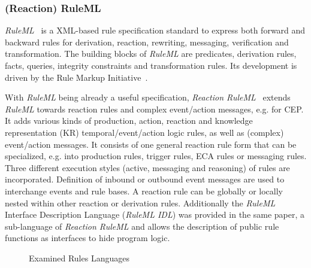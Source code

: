\documentclass[11pt]{article}%
\begin{document}
\subsubsection{(Reaction) RuleML}
\textit{RuleML}~\cite{2006-Boley-RuleML.pdf} is a XML-based rule specification standard to express both forward and backward rules for derivation, reaction, rewriting, messaging, verification and transformation. The building blocks of \textit{RuleML} are predicates, derivation rules, facts, queries, integrity constraints and transformation rules. Its development is driven by the Rule Markup Initiative~\cite{wwwruleml}.

With \textit{RuleML} being already a useful specification, \textit{Reaction RuleML}~\cite{2012-Paschke_etal-ReactionRuleML.pdf} extends \textit{RuleML} towards reaction rules and complex event/action messages, e.g. for CEP. It adds various kinds of production, action, reaction and knowledge representation (KR) temporal/event/action logic rules, as well as (complex) event/action messages. It consists of one general reaction rule form that can be specialized, e.g. into production rules, trigger rules, ECA rules or messaging rules. Three different execution styles (active, messaging and reasoning) of rules are incorporated. Definition of inbound or outbound event messages are used to interchange events and rule bases. A reaction rule can be globally or locally nested within other reaction or derivation rules. Additionally the \emph{RuleML} Interface Description Language (\textit{RuleML IDL}) was provided in the same paper, a sub-language of \textit{Reaction RuleML} and allows the description of public rule functions as interfaces to hide program logic.

\begin{figure}[htb]
\centering

\caption{Examined Rules Languages }
\end{figure}
\end{document}
